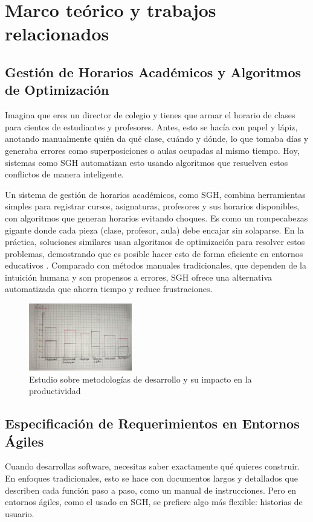 \section{Marco teórico y trabajos relacionados}
\subsection{Gestión de Horarios Académicos y Algoritmos de Optimización}
Imagina que eres un director de colegio y tienes que armar el horario de clases para cientos de estudiantes y profesores. Antes, esto se hacía con papel y lápiz, anotando manualmente quién da qué clase, cuándo y dónde, lo que tomaba días y generaba errores como superposiciones o aulas ocupadas al mismo tiempo. Hoy, sistemas como SGH automatizan esto usando algoritmos que resuelven estos conflictos de manera inteligente.

Un sistema de gestión de horarios académicos, como SGH, combina herramientas simples para registrar cursos, asignaturas, profesores y sus horarios disponibles, con algoritmos que generan horarios evitando choques. Es como un rompecabezas gigante donde cada pieza (clase, profesor, aula) debe encajar sin solaparse. En la práctica, soluciones similares usan algoritmos de optimización para resolver estos problemas, demostrando que es posible hacer esto de forma eficiente en entornos educativos \cite{saltos2022}. Comparado con métodos manuales tradicionales, que dependen de la intuición humana y son propensos a errores, SGH ofrece una alternativa automatizada que ahorra tiempo y reduce frustraciones.

\begin{figure}[h]
    \centering
    \includegraphics[width=0.4\textwidth]{graphics/estudio sobre metodologias de desarrollo y su impacto en la productividad.png}
    \caption{Estudio sobre metodologías de desarrollo y su impacto en la productividad}
    \label{fig:estudio}
\end{figure}

\subsection{Especificación de Requerimientos en Entornos Ágiles}
Cuando desarrollas software, necesitas saber exactamente qué quieres construir. En enfoques tradicionales, esto se hace con documentos largos y detallados que describen cada función paso a paso, como un manual de instrucciones. Pero en entornos ágiles, como el usado en SGH, se prefiere algo más flexible: historias de usuario.

